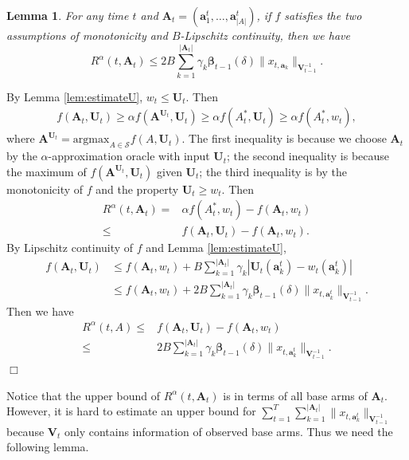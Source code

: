 \documentclass{article}
\newcommand{\bbeta}{\boldsymbol{\beta}}
\newcommand{\bA}{\mathbf{A}}
\newcommand{\ba}{\mathbf{a}}
\newcommand{\bU}{\mathbf{U}}
\newcommand{\bV}{\mathbf{V}}
\newcommand{\cS}{\mathcal{S}}
\newcommand{\argmax}{\mathrm{argmax}}
\newcommand{\abs}[1]{\left| #1 \right|}
\newcommand{\norm}[1]{\| #1 \|}
\newtheorem{lemma}[theorem]{Lemma}%
\newenvironment{proof}{\noindent {\textbf{Proof. }}}{$\Box$ \medskip}
\begin{document}
\begin{lemma} %
	\label{lem:DeltaEstimate}
	For any time $t$ and $\bA_t = (\ba_1^t, \ldots, \ba_{\abs{A}}^t)$, if $f$ satisfies the two assumptions of monotonicity and $B$-Lipschitz continuity, 
	then we have
	$$
		R^{\alpha}(t, \bA_t) \leq 2B \sum_{k=1}^{\abs{\bA_t}} \gamma_k \bbeta_{t-1}(\delta)\norm{x_{t, \ba_k}}_{\bV_{t-1}^{-1}}.
	$$
\end{lemma}
\begin{proof}
	By Lemma \ref{lem:estimateU}, $w_t \leq \bU_t$. Then
	\begin{align*}
		f(\bA_t, \bU_t) \geq \alpha f(\bA^{\bU_t}, \bU_t) \geq \alpha f(A_t^*, \bU_t) \geq \alpha f(A_t^*, w_t),
	\end{align*}
	where $\bA^{\bU_t} = \argmax_{A \in \cS} f(A, \bU_t)$. The first inequality is because we choose $\bA_t$ by the $\alpha$-approximation oracle with input $\bU_t$; the second inequality is because the maximum of $f(\bA^{\bU_t}, \bU_t)$ given $\bU_t$; the third inequality is by the monotonicity of $f$ and the property $\bU_t \geq w_t$. Then
	\begin{align*}
		R^{\alpha}(t, \bA_t) = &\alpha f(A_t^*, w_t) - f(\bA_t, w_t) \\
		\leq &f(\bA_t, \bU_t) - f(\bA_t, w_t).
	\end{align*}
	By Lipschitz continuity of $f$ and Lemma \ref{lem:estimateU},
	\begin{align*}
		f(\bA_t, \bU_t) &\leq f(\bA_t, w_t) + B \sum_{k=1}^{\abs{\bA_t}} \gamma_k \abs{\bU_t(\ba_k^t) - w_t(\ba_k^t)}\\
		& \leq f(\bA_t, w_t) + 2B \sum_{k=1}^{\abs{\bA_t}} \gamma_k\bbeta_{t-1}(\delta)\norm{x_{t, \ba_k^t}}_{\bV_{t-1}^{-1}}.
	\end{align*}
	Then we have
	\begin{align*}
		R^{\alpha}(t, A) \leq &f(\bA_t, \bU_t) - f(\bA_t, w_t) \\
		\leq &2B \sum_{k=1}^{\abs{\bA_t}} \gamma_k \bbeta_{t-1}(\delta)\norm{x_{t, \ba_k^t}}_{\bV_{t-1}^{-1}}.
	\end{align*}
\end{proof}

Notice that the upper bound of $R^{\alpha}(t, \bA_t)$ is in terms of all base arms of $\bA_t$. However, it is hard to estimate an upper bound for $\sum_{t=1}^T \sum_{k=1}^{\abs{\bA_t}} \norm{ x_{t, \ba_k^t} }_{ \bV_{t-1}^{-1} }$ because $\bV_t$ only contains information of observed base arms. Thus we need the following lemma.
\end{document}
